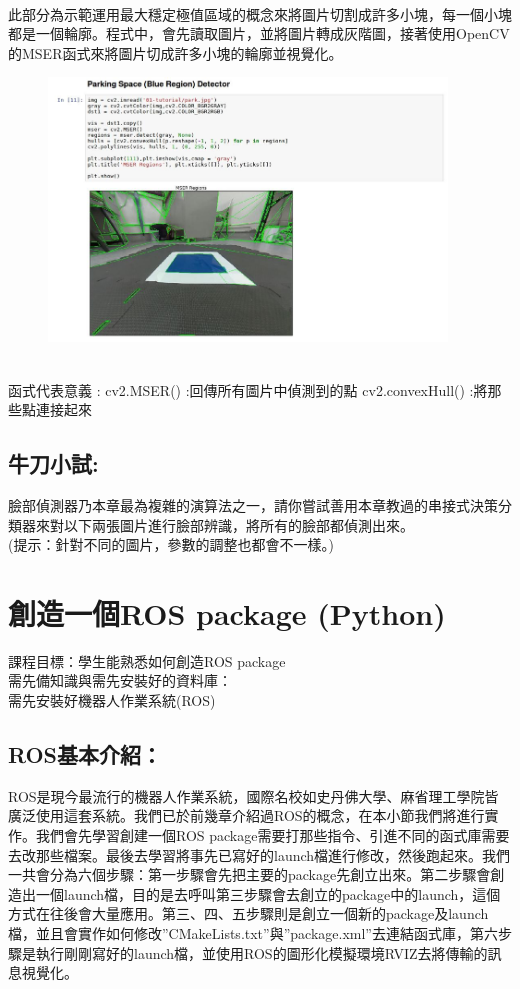 \documentclass{article}
\begin{document}
\\此部分為示範運用最大穩定極值區域的概念來將圖片切割成許多小塊，每一個小塊都是一個輪廓。程式中，會先讀取圖片，並將圖片轉成灰階圖，接著使用OpenCV的MSER函式來將圖片切成許多小塊的輪廓並視覺化。
\begin{figure}[htp]
    \begin{center}
        \includegraphics[width=300pt]{pic/5_1_7.png}
    \end{center}
\end{figure}
\\
函式代表意義 : 
cv2.MSER()			:回傳所有圖片中偵測到的點
cv2.convexHull()		:將那些點連接起來

\subsection{牛刀小試:}
臉部偵測器乃本章最為複雜的演算法之一，請你嘗試善用本章教過的串接式決策分類器來對以下兩張圖片進行臉部辨識，將所有的臉部都偵測出來。
\\(提示：針對不同的圖片，參數的調整也都會不一樣。)

\newpage
\section{創造一個ROS package (Python)}
課程目標：學生能熟悉如何創造ROS package
\\需先備知識與需先安裝好的資料庫：
\\需先安裝好機器人作業系統(ROS)

\subsection{ROS基本介紹：}
ROS是現今最流行的機器人作業系統，國際名校如史丹佛大學、麻省理工學院皆廣泛使用這套系統。我們已於前幾章介紹過ROS的概念，在本小節我們將進行實作。我們會先學習創建一個ROS package需要打那些指令、引進不同的函式庫需要去改那些檔案。最後去學習將事先已寫好的launch檔進行修改，然後跑起來。我們一共會分為六個步驟：第一步驟會先把主要的package先創立出來。第二步驟會創造出一個launch檔，目的是去呼叫第三步驟會去創立的package中的launch，這個方式在往後會大量應用。第三、四、五步驟則是創立一個新的package及launch檔，並且會實作如何修改”CMakeLists.txt”與”package.xml”去連結函式庫，第六步驟是執行剛剛寫好的launch檔，並使用ROS的圖形化模擬環境RVIZ去將傳輸的訊息視覺化。
\end{document}
